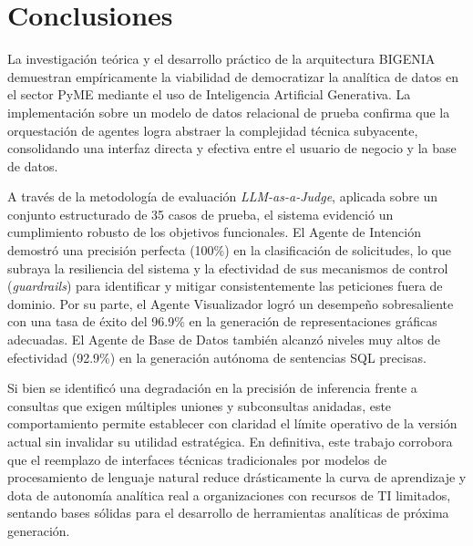 \section{Conclusiones}

La investigación teórica y el desarrollo práctico de la arquitectura BIGENIA
demuestran empíricamente la viabilidad de democratizar la analítica de datos
en el sector PyME mediante el uso de Inteligencia Artificial Generativa. La
implementación sobre un modelo de datos relacional de prueba confirma que la
orquestación de agentes logra abstraer la complejidad técnica subyacente,
consolidando una interfaz directa y efectiva entre el usuario de negocio y la
base de datos.

A través de la metodología de evaluación \textit{LLM-as-a-Judge}, aplicada
sobre un conjunto estructurado de 35 casos de prueba, el sistema evidenció un
cumplimiento robusto de los objetivos funcionales. El Agente de Intención
demostró una precisión perfecta (100\%) en la clasificación de solicitudes,
lo que subraya la resiliencia del sistema y la efectividad de sus mecanismos
de control (\textit{guardrails}) para identificar y mitigar consistentemente
las peticiones fuera de dominio. Por su parte, el Agente Visualizador logró
un desempeño sobresaliente con una tasa de éxito del 96.9\% en la generación
de representaciones gráficas adecuadas. El Agente de Base de Datos también
alcanzó niveles muy altos de efectividad (92.9\%) en la generación autónoma
de sentencias SQL precisas.

Si bien se identificó una degradación en la precisión de inferencia frente a
consultas que exigen múltiples uniones y subconsultas anidadas, este
comportamiento permite establecer con claridad el límite operativo de la
versión actual sin invalidar su utilidad estratégica. En definitiva, este
trabajo corrobora que el reemplazo de interfaces técnicas tradicionales por
modelos de procesamiento de lenguaje natural reduce drásticamente la curva de
aprendizaje y dota de autonomía analítica real a organizaciones con recursos de
TI limitados, sentando bases sólidas para el desarrollo de herramientas analíticas
de próxima generación.